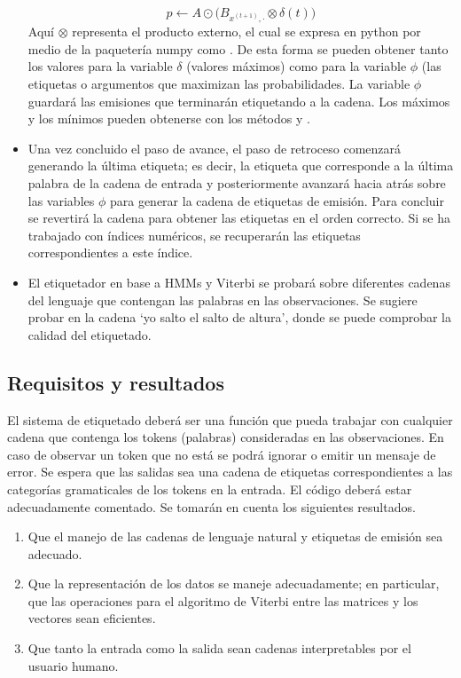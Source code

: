 \begin{itemize}
    $$p\leftarrow A \odot \Big( B_{x^{(t+1)}, \cdot} \otimes \delta(t) \Big)$$
    Aquí $\otimes$ representa el producto externo, el cual se expresa en python por medio de la paquetería numpy como .  De esta forma se pueden obtener tanto los valores para la variable $\delta$ (valores máximos) como para la variable $\phi$ (las etiquetas o argumentos que maximizan las probabilidades. La variable $\phi$ guardará las emisiones que terminarán etiquetando a la cadena. Los máximos y los mínimos pueden obtenerse con los métodos  y .
    \item Una vez concluido el paso de avance, el paso de retroceso comenzará generando la última etiqueta; es decir, la etiqueta que corresponde a la última palabra de la cadena de entrada y posteriormente avanzará hacia atrás sobre las variables $\phi$ para generar la cadena de etiquetas de emisión. Para concluir se revertirá la cadena para obtener las etiquetas en el orden correcto. Si se ha trabajado con índices numéricos, se recuperarán las etiquetas correspondientes a este índice.
    \item El etiquetador en base a HMMs y Viterbi se probará sobre diferentes cadenas del lenguaje que contengan las palabras en las observaciones. Se sugiere probar en la cadena `yo salto el salto de altura', donde se puede comprobar la calidad del etiquetado. 
\end{itemize}


\subsection{Requisitos y resultados}

El sistema de etiquetado deberá ser una función que pueda trabajar con cualquier cadena que contenga los tokens (palabras) consideradas en las observaciones. En caso de observar un token que no está se podrá ignorar o emitir un mensaje de error. Se espera que las salidas sea una cadena de etiquetas correspondientes a las categorías gramaticales de los tokens en la entrada. El código deberá estar adecuadamente comentado. Se tomarán en cuenta los siguientes resultados.

\begin{enumerate}
 \item Que el manejo de las cadenas de lenguaje natural y etiquetas de emisión sea adecuado.
 \item Que la representación de los datos se maneje adecuadamente; en particular, que las operaciones para el algoritmo de Viterbi entre las matrices y los vectores sean eficientes.
 \item Que tanto la entrada como la salida sean cadenas interpretables por el usuario humano.
\end{enumerate}
